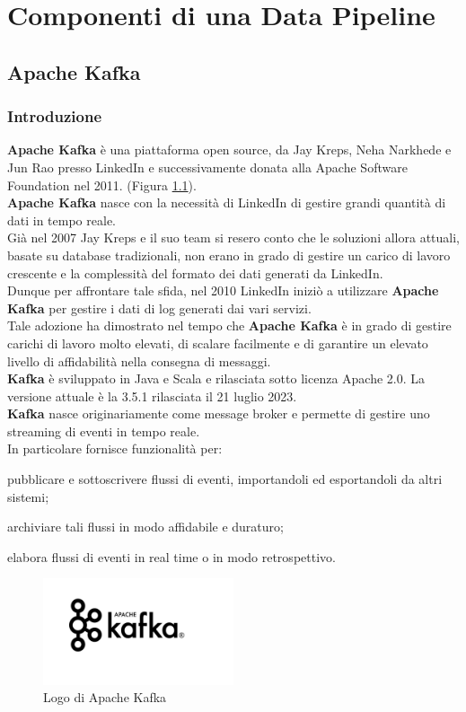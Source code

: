 \chapter{Componenti di una Data Pipeline}\label{cap:Componenti di una Data Pipeline}
\section{Apache Kafka}
\subsection{Introduzione}
\textbf{Apache Kafka} è una piattaforma \gls{open source}{}, da Jay Kreps, Neha Narkhede e Jun Rao presso LinkedIn e successivamente donata alla \gls{Apache Software Foundation}{} nel 2011. (Figura \ref{fig:logo_kafka}).\\
\textbf{Apache Kafka} nasce con la necessità di LinkedIn di gestire grandi quantità di dati in tempo reale.\\ Già nel 2007 
Jay Kreps e il suo team si resero conto che le soluzioni allora attuali, basate su database tradizionali, non erano in grado di gestire 
un carico di lavoro crescente e la complessità del formato dei dati generati da LinkedIn.\\
Dunque per affrontare tale sfida, nel 2010 LinkedIn iniziò a utilizzare \textbf{Apache Kafka} per gestire i dati di \gls{log}{} generati dai vari servizi. \\
Tale adozione ha dimostrato nel tempo che \textbf{Apache Kafka} è in grado di gestire carichi di lavoro molto elevati, di scalare facilmente e di garantire un elevato livello di affidabilità nella consegna di messaggi.\\ 
\textbf{Kafka} è sviluppato in Java e Scala e rilasciata sotto licenza Apache 2.0. La versione attuale è la 3.5.1 rilasciata il 21 luglio 2023.\\
\textbf{Kafka} nasce originariamente come \gls{message broker}{} e permette di gestire uno \gls{streaming di eventi}{} in tempo reale. \\ 
In particolare fornisce funzionalità per:
\begin{list}{*}{}
    \item pubblicare e sottoscrivere flussi di eventi, importandoli ed esportandoli da altri sistemi;
    \item archiviare tali flussi in modo affidabile e duraturo;
    \item elabora flussi di eventi in real time o in modo retrospettivo.
\end{list}
\begin{figure}[h]
    \centering
    \includegraphics[width=0.5\textwidth]{images/componenti/logo_kafka.png}
    \caption{Logo di Apache Kafka}
    \label{fig:logo_kafka}
\end{figure}
\pagebreak
